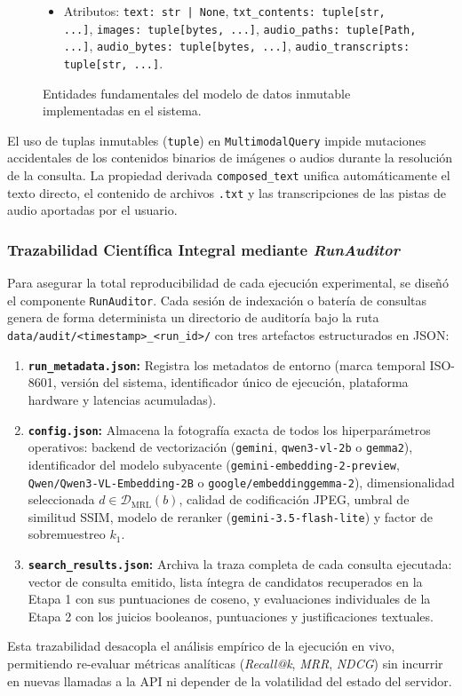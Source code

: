 \begin{figure}[htbp]
\begin{tcolorbox}[colback=white,colframe=gray!50,arc=2mm,title={\bfseries Estructura del Modelo de Dominio Inmutable}]
\begin{itemize}[leftmargin=1.5em]
    \begin{itemize}
        \item Atributos: \texttt{text: str | None}, \texttt{txt\_contents: tuple[str, ...]}, \texttt{images: tuple[bytes, ...]}, \texttt{audio\_paths: tuple[Path, ...]}, \texttt{audio\_bytes: tuple[bytes, ...]}, \texttt{audio\_transcripts: tuple[str, ...]}.
    \end{itemize}
\end{itemize}
\end{tcolorbox}
\caption{Entidades fundamentales del modelo de datos inmutable implementadas en el sistema.}
\label{fig:diagrama_modelo_datos}
\end{figure}

El uso de tuplas inmutables (\texttt{tuple}) en \texttt{MultimodalQuery} impide mutaciones accidentales de los contenidos binarios de imágenes o audios durante la resolución de la consulta. La propiedad derivada \texttt{composed\_text} unifica automáticamente el texto directo, el contenido de archivos \texttt{.txt} y las transcripciones de las pistas de audio aportadas por el usuario.

\subsubsection{Trazabilidad Científica Integral mediante \textit{RunAuditor}}
Para asegurar la total reproducibilidad de cada ejecución experimental, se diseñó el componente \texttt{RunAuditor}. Cada sesión de indexación o batería de consultas genera de forma determinista un directorio de auditoría bajo la ruta \texttt{data/audit/<timestamp>\_<run\_id>/} con tres artefactos estructurados en JSON:

\begin{enumerate}
    \item \textbf{\texttt{run\_metadata.json}:} Registra los metadatos de entorno (marca temporal ISO-8601, versión del sistema, identificador único de ejecución, plataforma hardware y latencias acumuladas).
    \item \textbf{\texttt{config.json}:} Almacena la fotografía exacta de todos los hiperparámetros operativos: backend de vectorización (\texttt{gemini}, \texttt{qwen3-vl-2b} o \texttt{gemma2}), identificador del modelo subyacente (\texttt{gemini-embedding-2-preview}, \texttt{Qwen/Qwen3-VL-Embedding-2B} o \texttt{google/embeddinggemma-2}), dimensionalidad seleccionada $d \in \mathcal{D}_{\text{MRL}}(b)$, calidad de codificación JPEG, umbral de similitud SSIM, modelo de reranker (\texttt{gemini-3.5-flash-lite}) y factor de sobremuestreo $k_1$.
    \item \textbf{\texttt{search\_results.json}:} Archiva la traza completa de cada consulta ejecutada: vector de consulta emitido, lista íntegra de candidatos recuperados en la Etapa 1 con sus puntuaciones de coseno, y evaluaciones individuales de la Etapa 2 con los juicios booleanos, puntuaciones y justificaciones textuales.
\end{enumerate}

Esta trazabilidad desacopla el análisis empírico de la ejecución en vivo, permitiendo re-evaluar métricas analíticas (\textit{Recall@k}, \textit{MRR}, \textit{NDCG}) sin incurrir en nuevas llamadas a la API ni depender de la volatilidad del estado del servidor.
